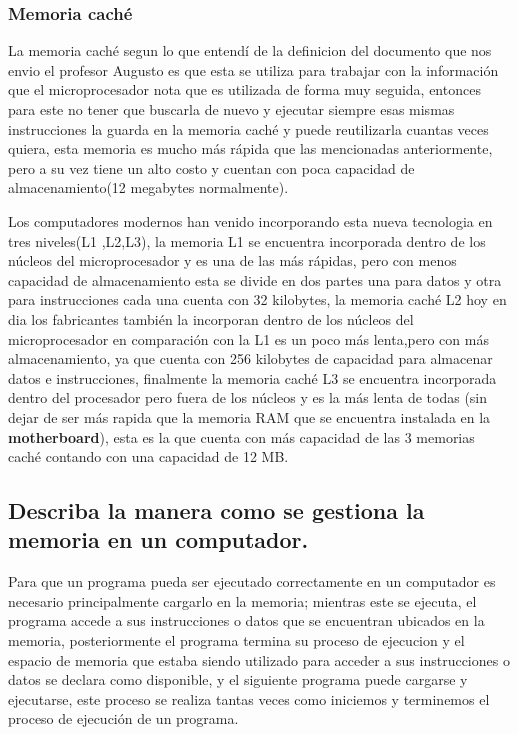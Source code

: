 \documentclass{article}
\begin{document}
\subsubsection{Memoria caché}
\noindent
La memoria caché segun lo que entendí de la definicion del documento que nos envio el profesor Augusto \cite{Augusto} es que esta se utiliza para trabajar con la información que el microprocesador nota que es utilizada de forma muy seguida, entonces para este no tener que buscarla de nuevo y ejecutar siempre esas mismas instrucciones la guarda en la memoria caché y puede reutilizarla cuantas veces quiera, esta memoria es mucho más rápida que las mencionadas anteriormente, pero a su vez tiene un alto costo y cuentan con poca capacidad de almacenamiento(12 megabytes normalmente).

\vspace{0.3cm}
\noindent
Los computadores modernos han venido incorporando esta nueva tecnologia en tres niveles(L1 ,L2,L3), la memoria L1 se encuentra incorporada dentro de los núcleos del microprocesador y es una de las más rápidas, pero con menos capacidad de almacenamiento esta se divide en dos partes una para datos y otra para instrucciones cada una cuenta con 32 kilobytes, la memoria caché L2 hoy en dia los fabricantes también la incorporan dentro de los núcleos del microprocesador en comparación con la L1 es un poco más lenta,pero con más almacenamiento, ya que cuenta con 256 kilobytes de capacidad para almacenar datos e instrucciones, finalmente la memoria caché L3 se encuentra incorporada dentro del procesador pero fuera de los núcleos y es la más lenta de todas (sin dejar de ser más rapida que la memoria RAM que se encuentra instalada en la \textbf{motherboard}), esta es la que cuenta con más capacidad de las 3 memorias caché contando con una capacidad de 12 MB. 

\subsection{Describa la manera como se gestiona la memoria en un computador.}
\noindent
Para que un programa pueda ser ejecutado correctamente en un computador es necesario principalmente cargarlo en la memoria; mientras este se  ejecuta, el programa accede a sus instrucciones o datos que se encuentran ubicados en la memoria, posteriormente el programa termina su proceso de ejecucion y el espacio de memoria que estaba siendo utilizado para acceder a sus instrucciones o datos se declara como disponible, y el siguiente programa puede cargarse y ejecutarse, este proceso se realiza tantas veces como iniciemos y terminemos el proceso de ejecución de un programa.
\end{document}
